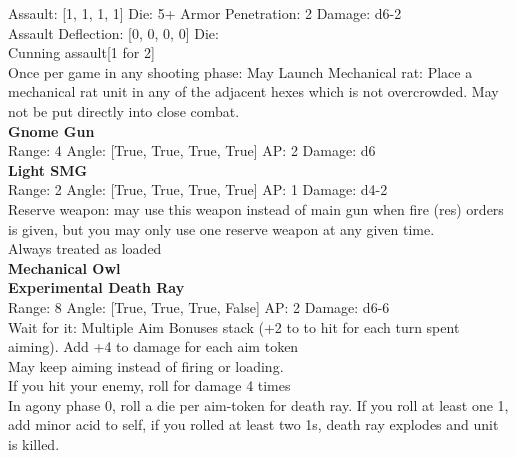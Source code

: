 Assault: [1, 1, 1, 1] Die: 5+ Armor Penetration: 2 Damage: d6-2 \\
Assault Deflection: [0, 0, 0, 0] Die: \\
\indent Cunning assault[1 for 2]\\ 
 

Once per game in any shooting phase: May Launch Mechanical rat: Place a mechanical rat unit in any of the adjacent hexes which is not overcrowded. May not be put directly into close combat. \\ 


{\bf Gnome Gun } \\



Range: 4  Angle: [True, True, True, True] AP: 2 Damage: d6 \\




{\bf Light SMG } \\



Range: 2  Angle: [True, True, True, True] AP: 1 Damage: d4-2 \\
Reserve weapon: may use this weapon instead of main gun when fire (res) orders is given, but you may only use one reserve weapon at any given time.\\ 
Always treated as loaded\\ 




{\bf Mechanical Owl } \\



{\bf Experimental Death Ray } \\



Range: 8  Angle: [True, True, True, False] AP: 2 Damage: d6-6 \\
Wait for it: Multiple Aim Bonuses stack (+2 to to hit for each turn spent aiming). Add +4 to damage for each aim token\\ 
May keep aiming instead of firing or loading.\\ 
If you hit your enemy, roll for damage 4 times\\ 
In agony phase 0, roll a die per aim-token for death ray. If you roll at least one 1, add minor acid to self, if you rolled at least two 1s, death ray explodes and unit is killed.\\ 




 



